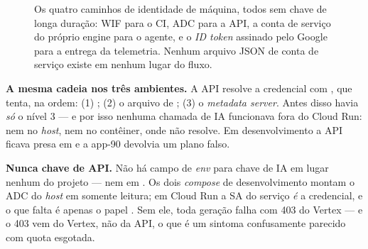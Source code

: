 \begin{figure}[H]
{}
\caption[Identidade de carga de trabalho]{Os quatro caminhos de identidade de
  máquina, todos sem chave de longa duração: WIF para o CI, ADC para a API, a
  conta de serviço do próprio engine para o agente, e o \emph{ID token} assinado
  pelo Google para a entrega da telemetria. Nenhum arquivo JSON de conta de
  serviço existe em nenhum lugar do fluxo.}
\label{fig:identidade-maquina}
\end{figure}

\begin{nota}
\textbf{A mesma cadeia nos três ambientes.} A API resolve a credencial com
, que tenta, na ordem: (1)
; (2) o arquivo de
; (3) o \emph{metadata server}. Antes
disso havia \emph{só} o nível 3 --- e por isso nenhuma chamada de IA funcionava
fora do Cloud Run: nem no \emph{host}, nem no contêiner, onde
 não resolve. Em desenvolvimento a API ficava presa
em  e a app-90 devolvia um plano falso.
\end{nota}

\begin{atencao}
\textbf{Nunca chave de API.} Não há campo de \emph{env} para chave de IA em lugar
nenhum do projeto --- nem em . Os dois \emph{compose} de
desenvolvimento montam o ADC do \emph{host} em  somente leitura; em
Cloud Run a SA do serviço \emph{é} a credencial, e o que falta é apenas o papel
. Sem ele, toda geração falha com 403 do Vertex --- e o
403 vem do Vertex, não da API, o que é um sintoma confusamente parecido com
quota esgotada.
\end{atencao}


